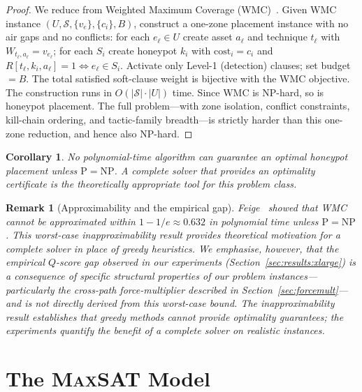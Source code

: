 \documentclass[journal]{IEEEtran}
\newtheorem{corollary}{Corollary}
\newtheorem{remark}{Remark}
\newcommand{\MAXSAT}{\textsc{MaxSAT}}
\newcommand{\qscore}{$Q$-score}
\begin{document}
\begin{proof}
We reduce from Weighted Maximum Coverage (WMC)~\cite{feige1998}.
Given WMC instance $(U,\mathcal{S},\{v_e\},\{c_i\},B)$, construct a
one-zone placement instance with no air gaps and no conflicts: for
each $e_\ell\in U$ create asset $a_\ell$ and technique $t_\ell$ with
$W_{t_\ell,a_\ell}=v_{e_\ell}$; for each $S_i$ create honeypot $k_i$
with $\mathrm{cost}_i=c_i$ and $R[t_\ell,k_i,a_\ell]=1\iff e_\ell
\in S_i$. Activate only Level-1 (detection) clauses; set budget
$=B$. The total satisfied soft-clause weight is bijective with the
WMC objective. The construction runs in $O(|\mathcal{S}|\cdot|U|)$
time. Since WMC is NP-hard, so is honeypot placement. The full
problem---with zone isolation, conflict constraints, kill-chain
ordering, and tactic-family breadth---is strictly harder than this
one-zone reduction, and hence also NP-hard.
\end{proof}

\begin{corollary}
\label{cor:nopoly}
No polynomial-time algorithm can guarantee an optimal honeypot
placement unless $\mathrm{P}=\mathrm{NP}$. A complete solver that
provides an optimality certificate is the theoretically appropriate
tool for this problem class.
\end{corollary}

\begin{remark}[Approximability and the empirical gap]
\label{rem:approx}
Feige~\cite{feige1998} showed that WMC cannot be approximated
within $1-1/e\approx0.632$ in polynomial time unless
$\mathrm{P}=\mathrm{NP}$. This worst-case inapproximability result
provides theoretical motivation for a complete solver in place of
greedy heuristics. We emphasise, however, that the empirical
\qscore{} gap observed in our experiments
(Section~\ref{sec:results:xlarge}) is a consequence of specific
structural properties of our problem instances---particularly the
cross-path force-multiplier described in
Section~\ref{sec:forcemult}---and is not directly derived from this
worst-case bound. The inapproximability result establishes that
greedy methods cannot provide optimality guarantees; the experiments
quantify the benefit of a complete solver on realistic instances.
\end{remark}

\section{The \MAXSAT{} Model}
\label{sec:model}
\end{document}
